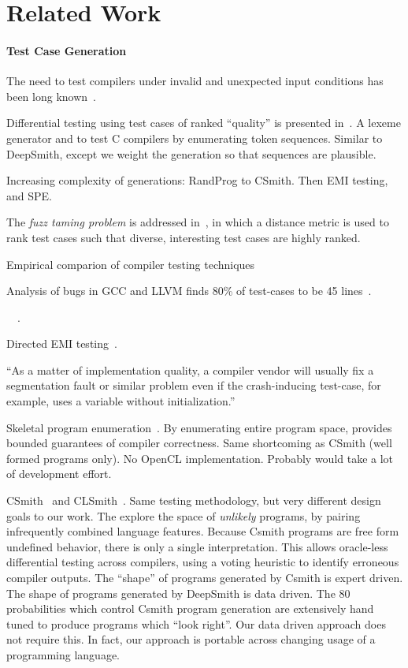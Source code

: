 \section{Related Work}\label{sec:rw}

\paragraph{Test Case Generation}

The need to test compilers under invalid and unexpected input conditions has been long known~\cite{Boujarwah1997}.

Differential testing using test cases of ranked ``quality'' is presented in~\cite{McKeeman1998}. A lexeme generator and to test C compilers by enumerating token sequences. Similar to DeepSmith, except we weight the generation so that sequences are plausible.

Increasing complexity of generations: RandProg to CSmith. Then EMI testing, and SPE.

The \emph{fuzz taming problem} is addressed in~\cite{Chen2013}, in which a distance metric is used to rank test cases such that diverse, interesting test cases are highly ranked.

Empirical comparion of compiler testing techniques~\cite{Chen2014a}

Analysis of bugs in GCC and LLVM finds 80\% of test-cases to be 45 lines~\cite{Sun2016}.

~\cite{Godefroid2008a,Le2015,Sun2016a}~\cite{Kossatchev2005}.

 Directed EMI testing~\cite{Le2015}.

``As a matter of implementation quality, a compiler vendor will usually fix a segmentation fault or similar problem even if the crash-inducing test-case, for example, uses a variable without initialization.''~\cite{Regehr2012a}

Skeletal program enumeration~\cite{Zhang2016a}. By enumerating entire program space, provides bounded guarantees of compiler correctness. Same shortcoming as CSmith (well formed programs only). No OpenCL implementation. Probably would take a lot of development effort. 

CSmith~\cite{Yang2011} and CLSmith~\cite{Lidbury2015a}. Same testing methodology, but very different design goals to our work. The explore the space of \emph{unlikely} programs, by pairing infrequently combined language features. Because Csmith programs are free form undefined behavior, there is only a single interpretation. This allows oracle-less differential testing across compilers, using a voting heuristic to identify erroneous compiler outputs. The ``shape'' of programs generated by Csmith is expert driven. The shape of programs generated by DeepSmith is data driven. The 80 probabilities which control Csmith program generation are extensively hand tuned to produce programs which ``look right''. Our data driven approach does not require this. In fact, our approach is portable across changing usage of a programming language.

